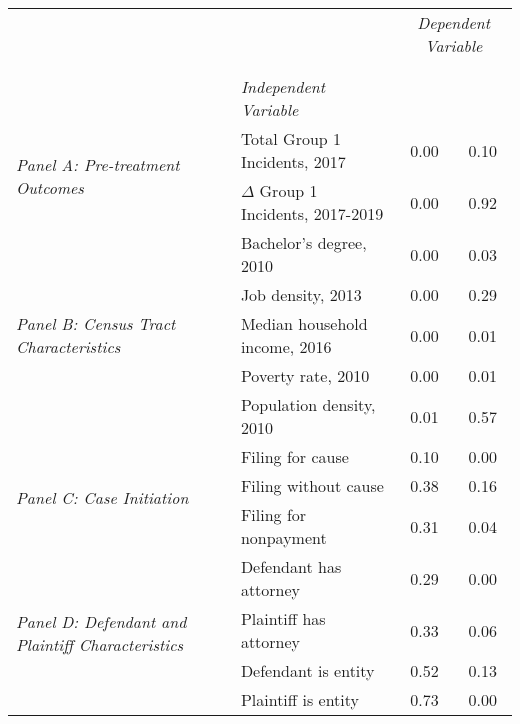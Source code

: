 \begin{tabular}{llcc}
\toprule
 &  & \multicolumn{2}{c}{\textit{Dependent Variable}} \\
\cline{3-4}
\\
 &  &  &  \\
 & \emph{Independent Variable} &  &  \\
\midrule
\multirow[c]{2}{3cm}{\textit{Panel A: Pre-treatment Outcomes}} & Total Group 1 Incidents, 2017 & 0.00 & 0.10 \\
 & $\Delta$ Group 1 Incidents, 2017-2019 & 0.00 & 0.92 \\
\cline{1-4}
\multirow[c]{5}{3cm}{\textit{Panel B: Census Tract Characteristics}} & Bachelor's degree, 2010 & 0.00 & 0.03 \\
 & Job density, 2013 & 0.00 & 0.29 \\
 & Median household income, 2016 & 0.00 & 0.01 \\
 & Poverty rate, 2010 & 0.00 & 0.01 \\
 & Population density, 2010 & 0.01 & 0.57 \\
\cline{1-4}
\multirow[c]{3}{3cm}{\textit{Panel C: Case Initiation}} & Filing for cause & 0.10 & 0.00 \\
 & Filing without cause & 0.38 & 0.16 \\
 & Filing for nonpayment & 0.31 & 0.04 \\
\cline{1-4}
\multirow[c]{4}{3cm}{\textit{Panel D: Defendant and Plaintiff Characteristics}} & Defendant has attorney & 0.29 & 0.00 \\
 & Plaintiff has attorney & 0.33 & 0.06 \\
 & Defendant is entity & 0.52 & 0.13 \\
 & Plaintiff is entity & 0.73 & 0.00 \\
\cline{1-4}
\bottomrule
\end{tabular}
